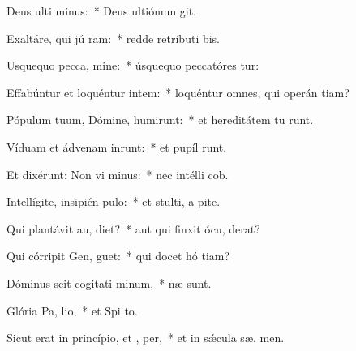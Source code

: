 \item Deus ulti minus:~* Deus ultiónum  git.
\item Exaltáre, qui jú ram:~* redde retributi bis.
\item Usquequo pecca, mine:~* úsquequo peccatóres tur:
\item Effabúntur et loquéntur intem:~* loquéntur omnes, qui operán tiam?
\item Pópulum tuum, Dómine, humirunt:~* et hereditátem tu runt.
\item Víduam et ádvenam inrunt:~* et pupíl runt.
\item Et dixérunt: Non vi minus:~* nec intélli  cob.
\item Intellígite, insipién  pulo:~* et stulti, a pite.
\item Qui plantávit au,  diet?~* aut qui finxit ócu,  derat?
\item Qui córripit Gen,  guet:~* qui docet hó tiam?
\item Dóminus scit cogitati minum,~*  næ sunt.
\item Glória Pa,  lio,~* et Spi to.
\item Sicut erat in princípio, et ,  per,~* et in sǽcula sæ. men.
